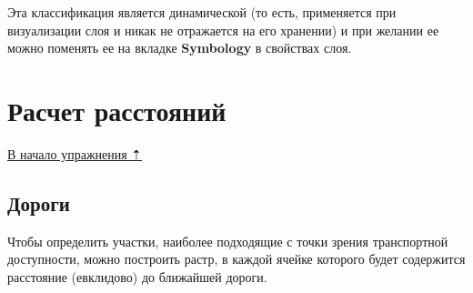 \documentclass[12pt,]{book}
\begin{document}
Эта классификация является динамической (то есть, применяется при визуализации слоя и никак не отражается на его хранении) и при желании ее можно поменять ее на вкладке \textbf{Symbology} в свойствах слоя.

\hypertarget{weighted-overlay-distances}{%
\section{Расчет расстояний}\label{weighted-overlay-distances}}

\protect\hyperlink{weighted-overlay}{В начало упражнения ⇡}

\hypertarget{weighted-overlay-roads}{%
\subsection{Дороги}\label{weighted-overlay-roads}}

Чтобы определить участки, наиболее подходящие с точки зрения транспортной доступности, можно построить растр, в каждой ячейке которого будет содержится расстояние (евклидово) до ближайшей дороги.
\end{document}
